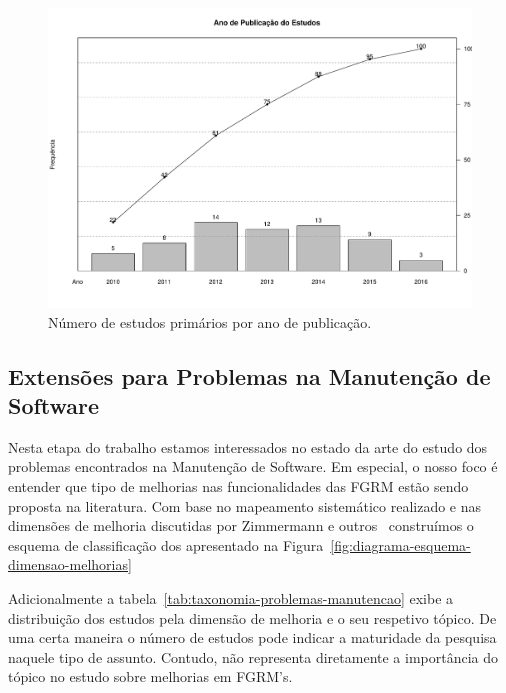 \begin{figure}[htpb]
	\centering
	\includegraphics[width=0.9\linewidth]{chapter-mapeamento-sistematico/img/ano-publicao-estudos.pdf}
	\caption{Número de estudos primários por ano de publicação.}
\label{fig:publicacao_por_ano}
\end{figure}

\subsection{Extensões para Problemas na Manutenção de Software}
\label{sub:extensões_para_problemas_na_manutenção_de_software}

Nesta etapa do trabalho estamos interessados no estado da arte do estudo dos
problemas encontrados na Manutenção de Software. Em especial, o nosso foco é
entender que tipo de melhorias nas funcionalidades das FGRM estão sendo proposta
na literatura. Com base no mapeamento sistemático realizado e nas dimensões de
melhoria discutidas por Zimmermann e outros~\cite{5070993} construímos o esquema
de classificação dos apresentado na
Figura~\ref{fig:diagrama-esquema-dimensao-melhorias}

Adicionalmente a tabela~\ref{tab:taxonomia-problemas-manutencao} exibe a
distribuição dos estudos pela dimensão de melhoria e o seu respetivo tópico. De
uma certa maneira o número de estudos  pode indicar a maturidade da pesquisa
naquele tipo de assunto. Contudo, não representa diretamente a importância do
tópico no estudo sobre melhorias em FGRM's.



